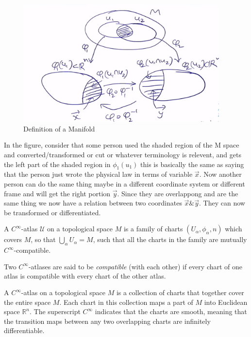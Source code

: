 \documentclass{article}
\begin{document}
\begin{figure}
    \begin{center}
        \includegraphics[width=0.95\textwidth]{figures/def_manifold.png}
    \end{center}
    \caption{Definition of a Manifold}\label{fig:definition_manifold}
\end{figure}

In the figure, consider that some person used the shaded region of the M space and converted/transformed or cut or whatever terminology is relevent, and gets the left part of the shaded region in $\phi_1(u_1)$ this is basically the same as saying that the person just wrote the physical law in terms of variable $\vec{x}$. Now another person can do the same thing maybe in a different coordinate system or different frame and will get the right portion $\vec{y}$. Since they are overlappong and are the same thing we now have a relation between two coordinates $\vec{x} \& \vec{y}$. They can now be transformed or differentiated. 

\begin{theorem}
    A \(C^\infty\)-atlas \( \mathcal{U} \) on a topological space \( M \) is a family of charts \( (U_\alpha, \phi_\alpha, n) \) which covers \( M \), so that \( \bigcup_\alpha U_\alpha = M \), such that all the charts in the family are mutually \(C^\infty\)-compatible.

    Two \(C^\infty\)-atlases are said to be \textit{compatible} (with each other) if every chart of one atlas is compatible with every chart of the other atlas.

\end{theorem}
A \(C^\infty\)-atlas on a topological space \(M\) is a collection of charts that together cover the entire space \(M\). Each chart in this collection maps a part of \(M\) into Euclidean space \(\mathbb{R}^n\). The superscript \(C^\infty\) indicates that the charts are smooth, meaning that the transition maps between any two overlapping charts are infinitely differentiable.
\end{document}
